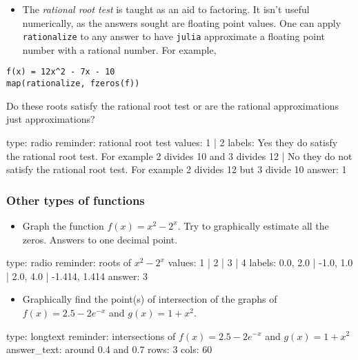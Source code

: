 \documentclass[12pt]{article}
\begin{document}
\begin{itemize}
\itemsep1pt\parskip0pt
\item
  The \emph{rational root test} is taught as an aid to factoring. It
  isn't useful numerically, as the answers sought are floating point
  values. One can apply \texttt{rationalize} to any answer to have
  \texttt{julia} approximate a floating point number with a rational
  number. For example,
\end{itemize}



\begin{verbatim}
f(x) = 12x^2 - 7x - 10
map(rationalize, fzeros(f))
\end{verbatim}
Do these roots satisfy the rational root test or are the rational
approximations just approximations?

\begin{answer}
type: radio
reminder: rational root test
values: 1 | 2
labels: Yes they do satisfy the rational root test. For example 2 divides 10 and 3 divides 12 | No they do not satisfy the rational root test. For example 2 divides 12 but 3  divide 10
answer: 1
\end{answer}

\subsubsection{Other types of functions}

\begin{itemize}
\itemsep1pt\parskip0pt
\item
  Graph the function $f(x)= x^2 - 2^x$. Try to graphically estimate all
  the zeros. Answers to one decimal point.
\end{itemize}

\begin{answer}
type: radio
reminder: roots of \( x^2 - 2^x \)
values: 1 | 2 | 3 | 4
labels: 0.0, 2.0 | -1.0, 1.0 | 2.0, 4.0 | -1.414, 1.414
answer: 3
\end{answer}

\begin{itemize}
\itemsep1pt\parskip0pt
\item
  Graphically find the point(s) of intersection of the graphs of
  $f(x) = 2.5-   2e^{-x}$ and $g(x) = 1 + x^2$.
\end{itemize}

\begin{answer}
type: longtext
reminder: intersections of \(f(x) = 2.5-2e^{-x}\) and \(g(x) = 1 + x^2\)
answer_text: around 0.4 and 0.7 
rows: 3
cols: 60
\end{answer}
\end{document}
